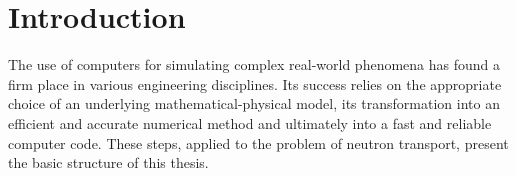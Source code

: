 \chapter{Introduction}

\ifpdf
    \graphicspath{{1_introduction/figures/PNG/}{1_introduction/figures/PDF/}{1_introduction/figures/}}
\else
    \graphicspath{{1_introduction/figures/EPS/}{1_introduction/figures/}}
\fi


The use of computers for simulating complex real-world phenomena has found a firm
place in various engineering disciplines. Its success relies on the appropriate choice of an underlying mathematical-physical
model, its transformation into an efficient and accurate numerical method and ultimately into a fast and reliable computer
code. These steps, applied to the problem of neutron transport, present the basic structure of this thesis.


